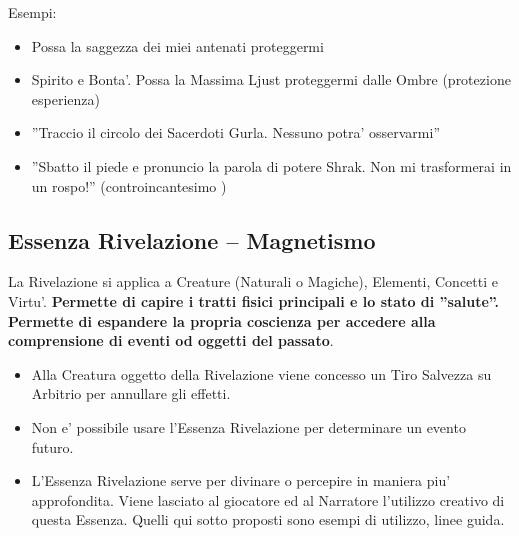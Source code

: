 \documentclass[a4paper,11pt,twoside,openany]{book}
\begin{document}
	\bigskip
	
	
	Esempi:
	\begin{itemize}
		\item 
		Possa la saggezza dei miei antenati proteggermi 
		\item 
		Spirito e Bonta'. Possa la Massima Ljust proteggermi dalle Ombre (protezione esperienza) 
		\item 
		''Traccio il circolo dei Sacerdoti Gurla. Nessuno potra' osservarmi'' 
		\item 
		''Sbatto il piede e pronuncio la parola di potere Shrak. Non mi trasformerai in un rospo!'' (controincantesimo )
	\end{itemize}
	
	\pagebreak
	
	\subsection{Essenza Rivelazione -- Magnetismo}
	
	\label{essenza-rivelazione---magnetismo}
	
	La Rivelazione si applica a Creature (Naturali o Magiche), Elementi, Concetti e Virtu'. \textbf{Permette di capire i tratti fisici principali e lo stato di ''salute''. Permette di espandere la propria coscienza per accedere alla comprensione di eventi od oggetti del passato}.
	\begin{itemize}
		\item 
		Alla Creatura oggetto della Rivelazione viene concesso un Tiro Salvezza
		su Arbitrio per annullare gli effetti. 
		\item 
		Non e' possibile usare l'Essenza Rivelazione per determinare un evento futuro. 
		\item 
		L'Essenza Rivelazione serve per divinare o percepire in maniera piu' approfondita. Viene lasciato al giocatore ed al Narratore l'utilizzo creativo di questa Essenza. Quelli qui sotto proposti sono esempi di utilizzo, linee guida. 
	\end{itemize}
	
	\bigskip
	
\end{document}
